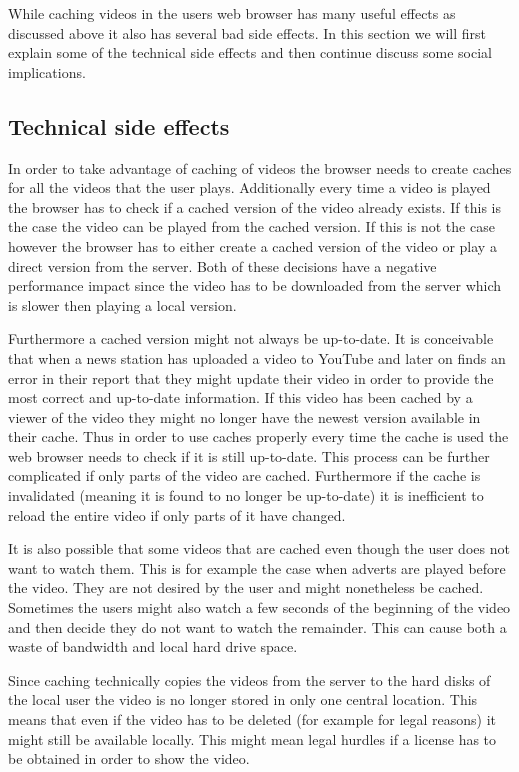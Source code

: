 While caching videos in the users web browser has many useful effects as discussed above it also has several bad side effects. In this section we will first explain some of the technical side effects and then continue discuss some social implications. 

\subsection{Technical side effects}
In order to take advantage of caching of videos the browser needs to create caches for all the videos that the user plays. Additionally every time a video is played the browser has to check if a cached version of the video already exists. If this is the case the video can be played from the cached version. If this is not the case however the browser has to either create a cached version of the video or play a direct version from the server. Both of these decisions have a negative performance impact since the video has to be downloaded from the server which is slower then playing a local version. 

Furthermore a cached version might not always be up-to-date. It is conceivable that when a news station has uploaded a video to YouTube and later on finds an error in their report that they might update their video in order to provide the most correct and up-to-date information. If this video has been cached by a viewer of the video they might no longer have the newest version available in their cache. Thus in order to use caches properly every time the cache is used the web browser needs to check if it is still up-to-date. This process can be further complicated if only parts of the video are cached. Furthermore if the cache is invalidated (meaning it is found to no longer be up-to-date) it is inefficient to reload the entire video if only parts of it have changed. 

It is also possible that some videos that are cached even though the user does not want to watch them. This is for example the case when adverts are played before the video. They are not desired by the user and might nonetheless be cached. Sometimes the users might also watch a few seconds of the beginning of the video and then decide they do not want to watch the remainder. This can cause both a waste of bandwidth and local hard drive space. 

Since caching technically copies the videos from the server to the hard disks of the local user the video is no longer stored in only one central location. This means that even if the video has to be deleted (for example for legal reasons) it might still be available locally. This might mean legal hurdles if a license has to be obtained in order to show the video. 


